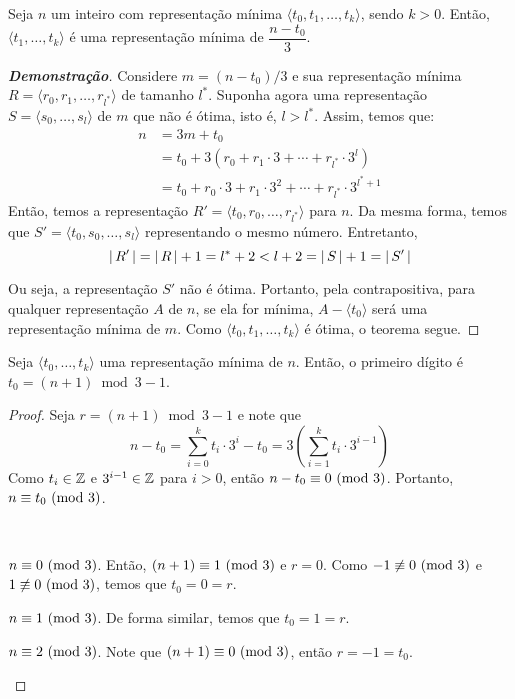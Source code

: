 \begin{theorem}
    Seja $n$ um inteiro com representação mínima $\langle t_0, t_1, \ldots, t_k \rangle$, sendo $k > 0$. Então, $\langle t_1, \ldots, t_k \rangle$ é uma representação mínima de $\dfrac{n - t_0}{3}$.
\end{theorem}

\begin{proof}[\textbf{Demonstração}]
    Considere $m = (n - t_0) / 3$ e sua representação mínima $R = \langle r_0, r_1, \ldots, r_{l^*} \rangle$ de tamanho $l^*$. Suponha agora uma representação $S = \langle s_0, \ldots, s_l \rangle$ de $m$ que não é ótima, isto é, $l > l^*$. Assim, temos que:
    \begin{align*}
        n &= 3 m + t_0 \\
        &= t_0 + 3 \left(r_0 + r_1 \cdot 3 + \cdots + r_{l^*} \cdot 3^l\right) \\
        &= t_0 + r_0 \cdot 3 + r_1 \cdot 3^2 + \cdots + r_{l^*} \cdot 3^{l^*+1}
    \end{align*}
    Então, temos a representação $R' = \langle t_0, r_0, \ldots, r_{l^*} \rangle$ para $n$. Da mesma forma, temos que $S' = \langle t_0, s_0, \ldots, s_l \rangle$ representando o mesmo número. Entretanto,
    \[
        {\lvert\,R'\,\rvert} = {\lvert\,R\,\rvert} + 1 = l^* + 2 < l + 2 = {\lvert\,S\,\rvert} + 1 = {\lvert\,S'\,\rvert}
    \]

    Ou seja, a representação $S'$ não é ótima. Portanto, pela contrapositiva, para qualquer representação $A$ de $n$, se ela for mínima, $A - \langle t_0 \rangle$ será uma representação mínima de $m$. Como $\langle t_0, t_1, \ldots, t_k \rangle$ é ótima, o teorema segue.
\end{proof}

\begin{theorem}
    Seja $\langle t_0, \ldots, t_k \rangle$ uma representação mínima de $n$. Então, o primeiro dígito é $t_0 = (n + 1) \bmod 3 - 1$.
\end{theorem}

\begin{proof}
    Seja $r = (n + 1) \bmod 3 - 1$ e note que
    \[
        n - t_0 = \sum_{i = 0}^k t_i \cdot 3^i - t_0 = 3 \left(\sum_{i = 1}^k t_i \cdot 3^{i-1} \right)
    \]
    Como $t_i \in \operatorname{\mathbb{Z}}$ e $3^{i - 1} \in \operatorname{\mathbb{Z}}$ para $i > 0$, então $n - t_0 \equiv 0 \ (\mathrm{mod}\ 3)$. Portanto, $n \equiv t_0 \ (\mathrm{mod}\ 3)$.

    ~

    \begin{casos}
        \item $n \equiv 0 \ (\mathrm{mod}\ 3)$. Então, $(n + 1) \equiv 1 \ (\mathrm{mod}\ 3)$ e $r = 0$. Como $-1 \not\equiv 0 \ (\mathrm{mod}\ 3)$ e $1 \not\equiv 0 \ (\mathrm{mod}\ 3)$, temos que $t_0 = 0 = r$.
        \item $n \equiv 1 \ (\mathrm{mod}\ 3)$. De forma similar, temos que $t_0 = 1 = r$.
        \item $n \equiv 2 \ (\mathrm{mod}\ 3)$. Note que $(n + 1) \equiv 0 \ (\mathrm{mod}\ 3)$, então $r = -1 = t_0$.
    \end{casos}
\end{proof}

